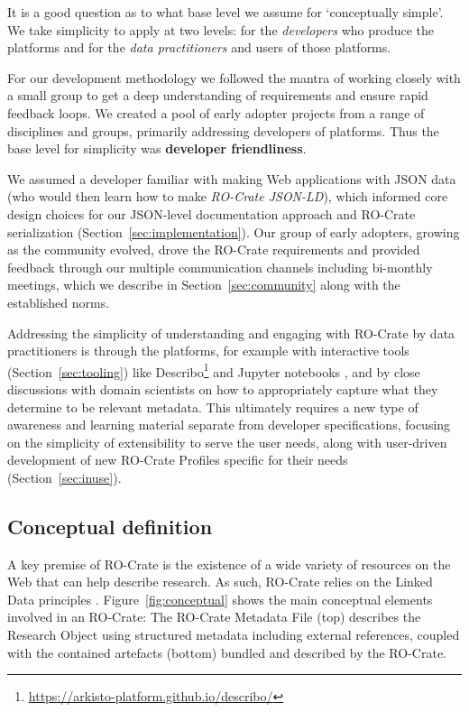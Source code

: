 \documentclass[ds,v1.1.2,openaccess]{iosart2x}%
\begin{document}
\label{sec:methodology}

It is a good question as to what base level we assume for `conceptually
simple'. We take simplicity to apply at two levels: for the
\textit{developers} who produce the platforms and for the \textit{data practitioners}
and users of those platforms.

For our development methodology we followed the mantra of working
closely with a small group to get a deep understanding of
requirements and ensure rapid feedback loops. We created a pool of
early adopter projects from a range of disciplines and groups,
primarily addressing developers of platforms. Thus the base level for
simplicity was \textbf{developer friendliness}.

We assumed a developer familiar with making Web applications with JSON
data (who would then learn how to make \textit{RO-Crate JSON-LD}), which
informed core design choices for our JSON-level documentation approach
and RO-Crate serialization (Section~\ref{sec:implementation}). Our
group of early adopters, growing as the community evolved, drove the
RO-Crate requirements and provided feedback through our multiple
communication channels including bi-monthly meetings, which we describe
in Section~\ref{sec:community} along with the established norms.

Addressing the simplicity of understanding and engaging with RO-Crate
by data practitioners is through the platforms, for example with
interactive tools (Section~\ref{sec:tooling}) like
Describo\footnote{\url{https://arkisto-platform.github.io/describo/}} \cite{describo} and
Jupyter notebooks \cite{doi:10.3233/978-1-61499-649-1-87}, and by close
discussions with domain scientists on how to appropriately capture what
they determine to be relevant metadata. This ultimately requires a new
type of awareness and learning material separate from developer
specifications, focusing on the simplicity of extensibility to serve
the user needs, along with user-driven development of new RO-Crate
Profiles specific for their needs (Section~\ref{sec:inuse}).

\subsection{Conceptual definition}%

\label{sec:conceptual}

A key premise of RO-Crate is the existence of a wide variety of
resources on the Web that can help describe research. As such, RO-Crate
relies on the Linked Data principles
\cite{doi:10.2200/S00334ED1V01Y201102WBE001}. Figure~\ref{fig:conceptual}
shows the main conceptual elements involved in an RO-Crate: The
RO-Crate Metadata File (top) describes the Research Object using
structured metadata including external references, coupled with the
contained artefacts (bottom) bundled and described by the RO-Crate.
\end{document}
